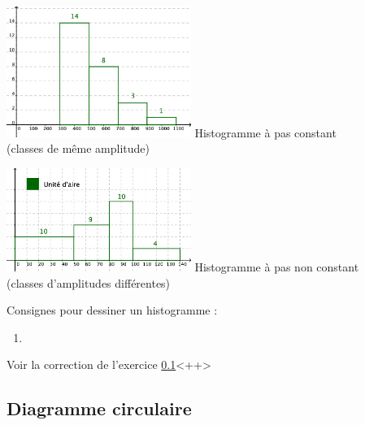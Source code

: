 \begin{multicols}{2}
  \begin{center}
    \includegraphics[width=6cm]{Stats_Fig4_HistPC.png}
    Histogramme à pas constant \\
    (classes de même amplitude)     
  \end{center}

  \columnbreak

  \begin{center}
    \includegraphics[width=6cm]{Stats_Fig4_HistPNC.png}
    Histogramme à pas non constant \\
    (classes d'amplitudes différentes)
  \end{center}
  
\end{multicols}

Consignes pour dessiner un histogramme :
\begin{enumerate}
    \item
        
\end{enumerate}
Voir la correction de l'exercice \ref{}<++>

\subsection{Diagramme circulaire}

